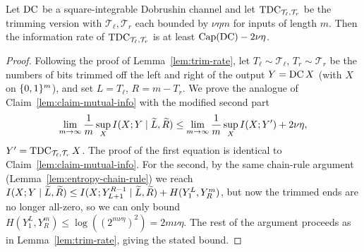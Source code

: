 \begin{lemma}
  \label{lem:tdc-rate}
  \notready
  Let $\mathrm{DC}$ be a square-integrable Dobrushin channel and let
  $\mathrm{TDC}_{\mathcal{T}_\ell,\mathcal{T}_r}$ be the trimming version with
  $\mathcal{T}_\ell,\mathcal{T}_r$ each bounded by $\nu\eta m$ for inputs of
  length $m$. Then the information rate of $\mathrm{TDC}_{\mathcal{T}_\ell,\mathcal{T}_r}$
  is at least $\mathrm{Cap}(\mathrm{DC})-2\nu\eta$.
\end{lemma}
\begin{proof}
  Following the proof of Lemma~\ref{lem:trim-rate}, let $T_\ell\sim\mathcal{T}_\ell$,
  $T_r\sim\mathcal{T}_r$ be the numbers of bits trimmed off the left and right of
  the output $Y=\mathrm{DC}\,X$ (with $X$ on $\{0,1\}^m$), and set $L=T_\ell$,
  $R=m-T_r$. We prove the analogue of Claim~\ref{lem:claim-mutual-info} with the
  modified second part
  \[
    \lim_{m\to\infty}\frac1m\sup_X I(X;Y\mid\widetilde L,\widetilde R)
      \le \lim_{m\to\infty}\frac1m\sup_X I(X;Y')+2\nu\eta,
  \]
  $Y'=\mathrm{TDC}_{\mathcal{T}_\ell,\mathcal{T}_r}\,X$. The proof of the first
  equation is identical to Claim~\ref{lem:claim-mutual-info}. For the second, by
  the same chain-rule argument (Lemma~\ref{lem:entropy-chain-rule}) we reach
  $I(X;Y\mid\widetilde L,\widetilde R)\le I(X;Y_{L+1}^{R-1}\mid\widetilde L,
   \widetilde R)+H(Y_1^L,Y_R^m)$, but now the trimmed ends are no longer all-zero,
  so we can only bound $H(Y_1^L,Y_R^m)\le\log((2^{m\nu\eta})^2)=2m\nu\eta$. The
  rest of the argument proceeds as in Lemma~\ref{lem:trim-rate}, giving the stated
  bound.
\end{proof}


